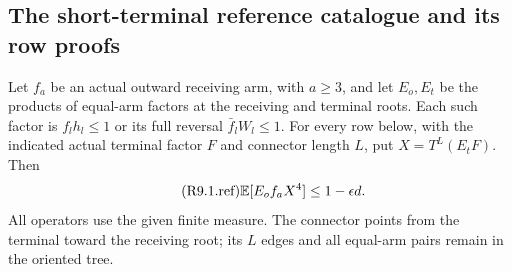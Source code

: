 \subsection{The short-terminal reference catalogue and its row proofs}\label{proof:R2-C009}
Let $f_a$ be an actual outward receiving arm, with $a\ge\allowbreak 3$, and let
$E_o,\allowbreak E_t$ be the products of equal-arm factors at the receiving and terminal
roots. Each such factor is $f_lh_l\le\allowbreak 1$ or its full reversal
$\bar f_lW_l\le\allowbreak 1$. For every row below, with the indicated actual terminal
factor $F$ and connector length $L$, put $X=\allowbreak T^L(E_tF)$. Then
\begin{equation}\tag{R9.1.ref}\label{eq:R9:reference}
 \mathbb E[E_of_aX^4]\le1-\epsilon d.
\end{equation}
All operators use the given finite measure. The connector points from the
terminal toward the receiving root; its $L$ edges and all equal-arm pairs
remain in the oriented tree.


